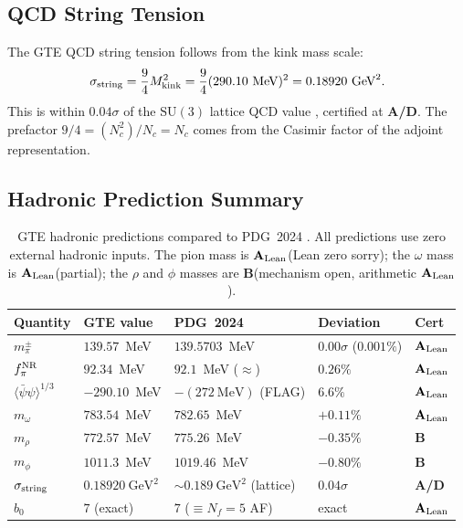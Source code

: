 \documentclass[11pt,openany]{book}
\theoremstyle{remark}
\newcommand{\Mkink}{M_{\rm kink}}
\newcommand{\CatAL}{\ensuremath{\textbf{A}_{\rm Lean}}}
\newcommand{\CatAD}{\textbf{A/D}}
\newcommand{\CatB}{\textbf{B}}
\begin{document}
\subsection*{QCD String Tension}

The GTE QCD string tension follows from the kink mass scale:
\begin{equation}
  \sigma_{\rm string} = \frac{9}{4}\Mkink^2
  = \frac{9}{4}(290.10~\text{MeV})^2 = 0.18920~\text{GeV}^2.
  \label{eq:string_tension}
\end{equation}
This is within $0.04\sigma$ of the $\text{SU}(3)$ lattice QCD value \cite{SpivackGTEQCDStructure},
certified at \CatAD.  The prefactor $9/4 = (N_c^2)/N_c = N_c$ comes from the
Casimir factor of the adjoint representation.

\subsection*{Hadronic Prediction Summary}

\begin{table}[htbp]
\centering
\caption{GTE hadronic predictions compared to PDG~2024 \cite{ParticleDataGroup2024}.
All predictions use zero external hadronic inputs.  The pion mass is \CatAL (Lean
zero sorry); the $\omega$ mass is \CatAL (partial); the $\rho$ and $\phi$ masses are
\CatB (mechanism open, arithmetic \CatAL).}
\label{tab:hadrons}
\setlength{\tabcolsep}{6pt}
\begin{tabular}{lllll}
\toprule
Quantity & GTE value & PDG~2024 & Deviation & Cert \\
\midrule
$m_\pi^\pm$ & $139.57$~MeV & $139.5703$~MeV & $0.00\sigma$ ($0.001\%$) & \CatAL \\
$f_\pi^{\rm NR}$ & $92.34$~MeV & $92.1$~MeV ($\approx$) & $0.26\%$ & \CatAL \\
$\langle\bar\psi\psi\rangle^{1/3}$ & $-290.10$~MeV & $-(272~\text{MeV})$ (FLAG) & $6.6\%$ & \CatAL \\
$m_\omega$ & $783.54$~MeV & $782.65$~MeV & $+0.11\%$ & \CatAL \\
$m_\rho$ & $772.57$~MeV & $775.26$~MeV & $-0.35\%$ & \CatB \\
$m_\phi$ & $1011.3$~MeV & $1019.46$~MeV & $-0.80\%$ & \CatB \\
$\sigma_{\rm string}$ & $0.18920~\text{GeV}^2$ & $\sim 0.189~\text{GeV}^2$ (lattice) & $0.04\sigma$ & \CatAD \\
$b_0$ & $7$ (exact) & $7$ ($\equiv N_f=5$ AF) & exact & \CatAL \\
\bottomrule
\end{tabular}
\end{table}
\end{document}

